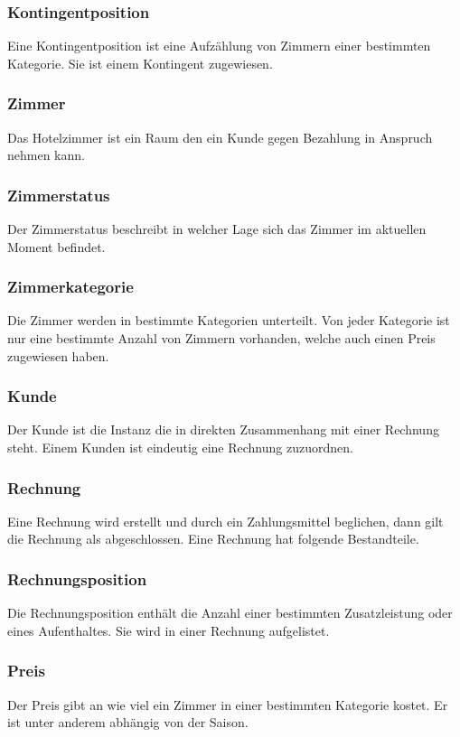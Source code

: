\documentclass[10pt,a4paper,titlepage]{article}
\begin{document}
\subsubsection{Kontingentposition}
Eine Kontingentposition ist eine Aufzählung von \Gls{Zimmer}n einer bestimmten
Kategorie. Sie ist einem \Gls{Kontingent} zugewiesen.
\subsubsection{\Gls{Zimmer}}
Das Hotelzimmer ist ein Raum den ein Kunde gegen Bezahlung in Anspruch nehmen kann.
\subsubsection{Zimmerstatus}
Der Zimmerstatus beschreibt in welcher Lage sich das \Gls{Zimmer} im aktuellen Moment befindet.
\subsubsection{Zimmerkategorie}
Die \Gls{Zimmer} werden in bestimmte Kategorien unterteilt. Von jeder Kategorie ist
nur eine bestimmte Anzahl von \Gls{Zimmer}n vorhanden, welche auch einen Preis
zugewiesen haben.
\subsubsection{\Gls{Kunde}}
Der \Gls{Kunde} ist die Instanz die in direkten Zusammenhang mit einer Rechnung steht.
Einem \Gls{Kunde}n ist eindeutig eine \Gls{Rechnung} zuzuordnen.
\subsubsection{\Gls{Rechnung}}
Eine \Gls{Rechnung} wird erstellt und durch ein Zahlungsmittel beglichen, dann gilt die \Gls{Rechnung} als abgeschlossen. Eine \Gls{Rechnung} hat folgende Bestandteile.
\subsubsection{Rechnungsposition}
Die Rechnungsposition enthält die Anzahl einer bestimmten \Gls{Zusatzleistung} oder
eines Aufenthaltes. Sie wird in einer \Gls{Rechnung} aufgelistet.
\subsubsection{Preis}
Der Preis gibt an wie viel ein \Gls{Zimmer} in einer bestimmten Kategorie kostet. Er
ist unter anderem abhängig von der \Gls{Saison}.
\end{document}
